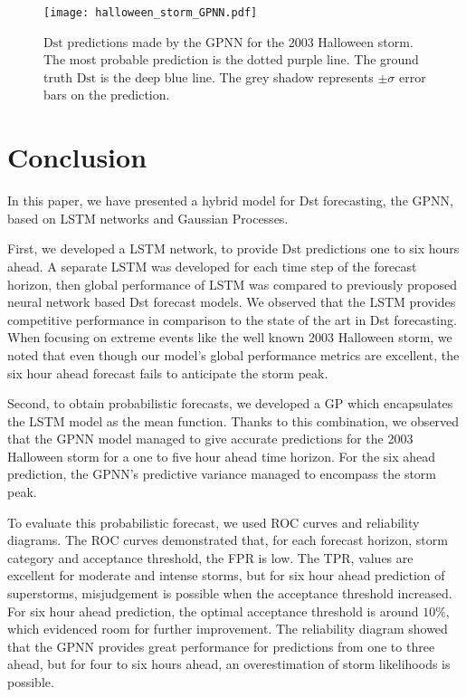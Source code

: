 \begin{figure}
	\texttt{[image: halloween\_storm\_GPNN.pdf]}
	\caption{$\mathrm{Dst}$ predictions made by the GPNN for the 2003 Halloween storm. 
	The most probable prediction is the dotted purple line. 
	The ground truth $\mathrm{Dst}$ is the deep blue line. 
	The grey shadow represents $\pm\sigma$ error bars on the prediction.}
    \label{fig:gpnnhalloween}
\end{figure}



\section{Conclusion}


In this paper, we have presented a hybrid model for Dst forecasting, the GPNN, based on LSTM networks and Gaussian Processes. 

First, we developed a LSTM network, to provide Dst predictions one to six hours ahead. A separate LSTM was 
developed for each time step of the forecast horizon, then global performance of LSTM was compared to previously 
proposed neural network based Dst forecast models. We observed that the LSTM provides competitive performance in comparison 
to the state of the art in Dst forecasting. When focusing on extreme events like the well known 2003 Halloween storm, we noted that 
even though our model's global performance metrics are excellent, the six hour ahead forecast fails to anticipate the storm peak. 

Second, to obtain probabilistic forecasts, we developed a GP which encapsulates the LSTM model as the mean function. Thanks to this 
combination, we observed that the GPNN model managed to give accurate predictions for the 2003 Halloween storm for a one to five hour 
ahead time horizon. For the six ahead prediction, the GPNN's predictive variance managed to encompass the storm peak. 

To evaluate this probabilistic forecast, we used ROC curves and reliability diagrams. The ROC curves demonstrated that, 
for each forecast horizon, storm category and acceptance threshold, the FPR is low. The TPR, values are excellent for moderate 
and intense storms, but for six hour ahead prediction of superstorms, misjudgement is possible when the acceptance threshold increased. 
For six hour ahead prediction, the optimal acceptance threshold is around $10\%$, which evidenced room for further improvement. The 
reliability diagram showed that the GPNN provides great performance for predictions from one to three ahead, but for four to six hours 
ahead, an overestimation of storm likelihoods is possible.


